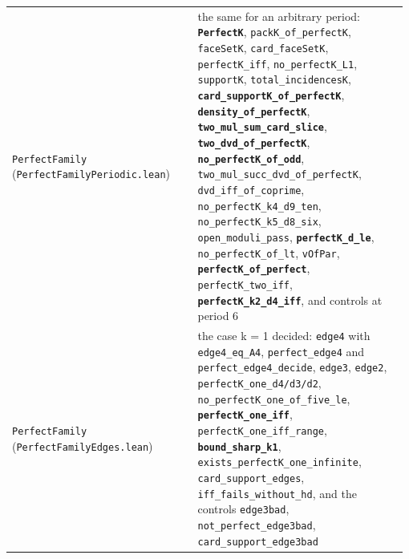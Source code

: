 \documentclass[11pt,a4paper]{article}
\theoremstyle{named}
\begin{document}
\begin{small}
\begin{longtable}{>{\raggedright\arraybackslash}p{0.331\linewidth}>{\raggedright\arraybackslash}p{0.05\linewidth}>{\raggedright\arraybackslash}p{0.596\linewidth}}
\texttt{PerfectFamily} (\texttt{PerfectFamilyPeriodic.\allowbreak{}lean}) & 979 & the same for an arbitrary period: \textbf{\texttt{PerfectK}}, \texttt{packK\_\allowbreak{}of\_\allowbreak{}perfectK}, \texttt{faceSetK}, \texttt{card\_\allowbreak{}faceSetK}, \texttt{perfectK\_\allowbreak{}iff}, \texttt{no\_\allowbreak{}perfectK\_\allowbreak{}L1}, \texttt{supportK}, \texttt{total\_\allowbreak{}incidencesK}, \textbf{\texttt{card\_\allowbreak{}supportK\_\allowbreak{}of\_\allowbreak{}perfectK}}, \textbf{\texttt{density\_\allowbreak{}of\_\allowbreak{}perfectK}}, \textbf{\texttt{two\_\allowbreak{}mul\_\allowbreak{}sum\_\allowbreak{}card\_\allowbreak{}slice}}, \textbf{\texttt{two\_\allowbreak{}dvd\_\allowbreak{}of\_\allowbreak{}perfectK}}, \textbf{\texttt{no\_\allowbreak{}perfectK\_\allowbreak{}of\_\allowbreak{}odd}}, \texttt{two\_\allowbreak{}mul\_\allowbreak{}succ\_\allowbreak{}dvd\_\allowbreak{}of\_\allowbreak{}perfectK}, \texttt{dvd\_\allowbreak{}iff\_\allowbreak{}of\_\allowbreak{}coprime}, \texttt{no\_\allowbreak{}perfectK\_\allowbreak{}k4\_\allowbreak{}d9\_\allowbreak{}ten}, \texttt{no\_\allowbreak{}perfectK\_\allowbreak{}k5\_\allowbreak{}d8\_\allowbreak{}six}, \texttt{open\_\allowbreak{}moduli\_\allowbreak{}pass}, \textbf{\texttt{perfectK\_\allowbreak{}d\_\allowbreak{}le}}, \texttt{no\_\allowbreak{}perfectK\_\allowbreak{}of\_\allowbreak{}lt}, \texttt{vOfPar}, \textbf{\texttt{perfectK\_\allowbreak{}of\_\allowbreak{}perfect}}, \texttt{perfectK\_\allowbreak{}two\_\allowbreak{}iff}, \textbf{\texttt{perfectK\_\allowbreak{}k2\_\allowbreak{}d4\_\allowbreak{}iff}}, and controls at period 6 \\
\texttt{PerfectFamily} (\texttt{PerfectFamilyEdges.\allowbreak{}lean}) & 969 & the case k = 1 decided: \texttt{edge4} with \texttt{edge4\_\allowbreak{}eq\_\allowbreak{}A4}, \texttt{perfect\_\allowbreak{}edge4} and \texttt{perfect\_\allowbreak{}edge4\_\allowbreak{}decide}, \texttt{edge3}, \texttt{edge2}, \texttt{perfectK\_\allowbreak{}one\_\allowbreak{}d4/d3/d2}, \texttt{no\_\allowbreak{}perfectK\_\allowbreak{}one\_\allowbreak{}of\_\allowbreak{}five\_\allowbreak{}le}, \textbf{\texttt{perfectK\_\allowbreak{}one\_\allowbreak{}iff}}, \texttt{perfectK\_\allowbreak{}one\_\allowbreak{}iff\_\allowbreak{}range}, \textbf{\texttt{bound\_\allowbreak{}sharp\_\allowbreak{}k1}}, \texttt{exists\_\allowbreak{}perfectK\_\allowbreak{}one\_\allowbreak{}infinite}, \texttt{card\_\allowbreak{}support\_\allowbreak{}edges}, \texttt{iff\_\allowbreak{}fails\_\allowbreak{}without\_\allowbreak{}hd}, and the controls \texttt{edge3bad}, \texttt{not\_\allowbreak{}perfect\_\allowbreak{}edge3bad}, \texttt{card\_\allowbreak{}support\_\allowbreak{}edge3bad} \\
\hline
\end{longtable}
\end{small}
\end{document}
